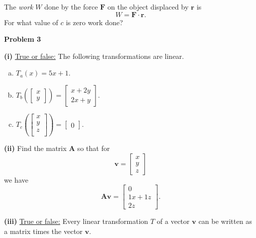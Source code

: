 \documentclass[12pt]{amsbook}
\newcommand{\DD}{\displaystyle}
\begin{document}
The \emph{work} $W$ done by the force $\mathbf{F}$ on the object displaced by $\mathbf{r}$ is
\[
W=\mathbf{F}\cdot \mathbf{r}.
\]
For what value of $c$ is zero work done?





\newpage

\textbf{Problem 3}

\vspace{.25cm}

\textbf{(i)} \underline{True or false:} The following transformations are linear. \\

\begin{enumerate}[(a)]
    \item 
    $\DD{T_a(x)=5x+1}$. 
    \item $\DD{T_b\left(\begin{bmatrix} x\\ y \end{bmatrix} \right) = \begin{bmatrix} x+2y\\ 2x + y \end{bmatrix}}.$
    \item $\DD{T_c\left( \begin{bmatrix} x\\ y\\ z\\ \end{bmatrix} \right) = \begin{bmatrix} 0 \end{bmatrix}}$.
\end{enumerate}
\vspace*{1cm}

\noindent \textbf{(ii)} Find the matrix $\mathbf{A}$ so that for 
\[
\mathbf{v}=\begin{bmatrix}
x\\ y \\ z
\end{bmatrix}
\]
we have
\[
\mathbf{Av}=\begin{bmatrix} 0\\ 1x+1z\\ 2z\end{bmatrix}.
\]

\vspace*{8cm}

\noindent \textbf{(iii)} \underline{True or false:} Every linear transformation $T$ of a vector $\mathbf{v}$ can be written as a matrix times the vector $\mathbf{v}$.
\end{document}
